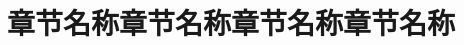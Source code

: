 \documentclass[color=blue]{textbook-cn}%
\begin{document}
\begin{Appendix}
\DeepThink{\lipsum[2]}

\Remark{\lipsum[2]}






\clearpage
\begin{Block}[测试标题]
\lipsum[1-4]\par\lipsum[5][1-4]
\end{Block}


\chapter*{章节名称章节名称章节名称章节名称}
\lipsum
\lipsum





\end{Appendix}
\end{document}

